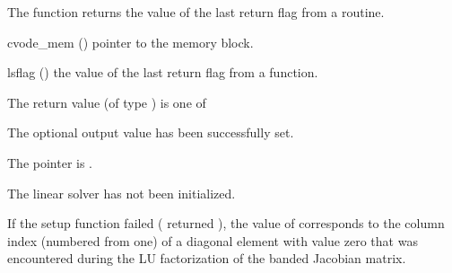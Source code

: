 {
  The function  returns the
  value of the last return flag from a {\cvband} routine. 
}
{
  \begin{args}
  \item[cvode\_mem] ()
    pointer to the {\cvodes} memory block.
  \item[lsflag] ()
    the value of the last return flag from a {\cvband} function.
  \end{args}
}
{
  The return value  (of type ) is one of
  \begin{args}
  \item[\Id{CVBAND\_SUCCESS}] 
    The optional output value has been successfully set.
  \item[\Id{CVBAND\_MEM\_NULL}]
    The  pointer is .
  \item[\Id{CVBAND\_LMEM\_NULL}]
    The {\cvband} linear solver has not been initialized.
  \end{args}
}
{
  If the {\cvband} setup function failed ( returned ),
  the value of  corresponds to the column index (numbered from one) of
  a diagonal element with value zero that was encountered during the LU
  factorization of the banded Jacobian matrix.
}


